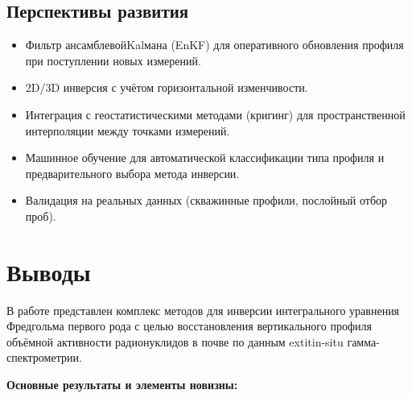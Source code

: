 \documentclass[12pt,a4paper]{article}
\begin{document}
\subsection{Перспективы развития}
\label{sub:perspectives}

\begin{itemize}[leftmargin=*,itemsep=2pt]
  \item Фильтр ансамблевойKalмана (EnKF) для оперативного обновления
        профиля при поступлении новых измерений.
  \item 2D/3D инверсия с учётом горизонтальной изменчивости.
  \item Интеграция с геостатистическими методами (кригинг)
        для пространственной интерполяции между точками измерений.
  \item Машинное обучение для автоматической классификации
        типа профиля и предварительного выбора метода инверсии.
  \item Валидация на реальных данных (скважинные профили,
        послойный отбор проб).
\end{itemize}


\section{Выводы}
\label{sec:conclusions}

В работе представлен комплекс методов для инверсии интегрального
уравнения Фредгольма первого рода с целью восстановления
вертикального профиля объёмной активности радионуклидов
в почве по данным 	extit{in-situ} гамма-спектрометрии.

\textbf{Основные результаты и элементы новизны:}
\end{document}
